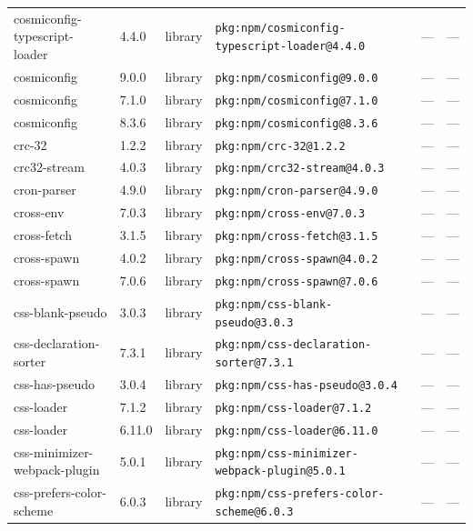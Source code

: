 \documentclass[11pt,a4paper]{article}
\begin{document}
\begin{longtable}{|p{4cm}|p{2cm}|p{1.6cm}|p{5cm}|p{1.5cm}|p{3.5cm}|}
\raggedright cosmiconfig-typescript-loader & 4.4.0 & library & \small\texttt{pkg:npm/cosmiconfig-typescript-loader@4.4.0} & — & \small — \\
\raggedright cosmiconfig & 9.0.0 & library & \small\texttt{pkg:npm/cosmiconfig@9.0.0} & — & \small — \\
\raggedright cosmiconfig & 7.1.0 & library & \small\texttt{pkg:npm/cosmiconfig@7.1.0} & — & \small — \\
\raggedright cosmiconfig & 8.3.6 & library & \small\texttt{pkg:npm/cosmiconfig@8.3.6} & — & \small — \\
\raggedright crc-32 & 1.2.2 & library & \small\texttt{pkg:npm/crc-32@1.2.2} & — & \small — \\
\raggedright crc32-stream & 4.0.3 & library & \small\texttt{pkg:npm/crc32-stream@4.0.3} & — & \small — \\
\raggedright cron-parser & 4.9.0 & library & \small\texttt{pkg:npm/cron-parser@4.9.0} & — & \small — \\
\raggedright cross-env & 7.0.3 & library & \small\texttt{pkg:npm/cross-env@7.0.3} & — & \small — \\
\raggedright cross-fetch & 3.1.5 & library & \small\texttt{pkg:npm/cross-fetch@3.1.5} & — & \small — \\
\raggedright cross-spawn & 4.0.2 & library & \small\texttt{pkg:npm/cross-spawn@4.0.2} & — & \small — \\
\raggedright cross-spawn & 7.0.6 & library & \small\texttt{pkg:npm/cross-spawn@7.0.6} & — & \small — \\
\raggedright css-blank-pseudo & 3.0.3 & library & \small\texttt{pkg:npm/css-blank-pseudo@3.0.3} & — & \small — \\
\raggedright css-declaration-sorter & 7.3.1 & library & \small\texttt{pkg:npm/css-declaration-sorter@7.3.1} & — & \small — \\
\raggedright css-has-pseudo & 3.0.4 & library & \small\texttt{pkg:npm/css-has-pseudo@3.0.4} & — & \small — \\
\raggedright css-loader & 7.1.2 & library & \small\texttt{pkg:npm/css-loader@7.1.2} & — & \small — \\
\raggedright css-loader & 6.11.0 & library & \small\texttt{pkg:npm/css-loader@6.11.0} & — & \small — \\
\raggedright css-minimizer-webpack-plugin & 5.0.1 & library & \small\texttt{pkg:npm/css-minimizer-webpack-plugin@5.0.1} & — & \small — \\
\raggedright css-prefers-color-scheme & 6.0.3 & library & \small\texttt{pkg:npm/css-prefers-color-scheme@6.0.3} & — & \small — \\

\end{longtable}
\end{document}
